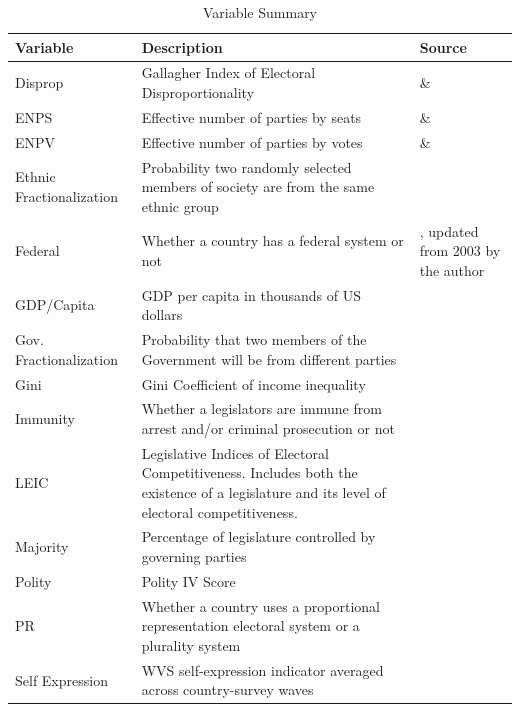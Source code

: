 \documentclass[a4paper]{article}\usepackage{graphicx, color}
\begin{document}
\begin{table}[!h]
    \begin{center}
    \caption{Variable Summary}
    \label{var_summary}
    \begin{tabular}{l m{7cm} m{3.5cm}}

            \hline
            Variable & Description & Source \\
            \hline \hline
            Disprop & Gallagher Index of Electoral Disproportionality & \cite{Gallagher2012} \& \cite{Carey2011} \\
            ENPS & Effective number of parties by seats & \cite{Gallagher2012} \& \cite{Carey2011} \\
            ENPV & Effective number of parties by votes & \cite{Gallagher2012} \& \cite{Carey2011} \\
            Ethnic Fractionalization & Probability two randomly selected members of society are from the same ethnic group & \cite{Alesina2003} \\
            Federal & Whether a country has a federal system or not & \cite{Carey2011}, updated from 2003 by the author \\           
            GDP/Capita & GDP per capita in thousands of US dollars & \cite{WorldBank2011} \\
            Gov. Fractionalization & Probability that two members of the Government will be from different parties & \cite{DPI2001} \\
            Gini & Gini Coefficient of income inequality & \cite{UNU2008} \\
            Immunity & Whether a legislators are immune from arrest and/or criminal prosecution or not & \cite{Fish2009} \\
            LEIC & Legislative Indices of Electoral Competitiveness. Includes both the existence of a legislature and its level of electoral competitiveness. & \cite{DPI2001} \\
            Majority & Percentage of legislature controlled by governing parties & \cite{DPI2001} \\
            Polity & Polity IV Score & \cite{Marshall2009} \\
            PR & Whether a country uses a proportional representation electoral system or a plurality system & \cite{DPI2001} \\
            Self Expression & WVS self-expression indicator averaged across country-survey waves & \cite{WVS2009} \\

\end{tabular}
\end{center}
\end{table}
\end{document}
